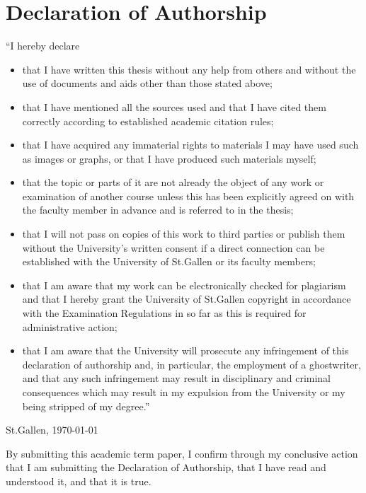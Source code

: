 \newpage
\thispagestyle{empty}

\section*{Declaration of Authorship}
“I hereby declare
\begin{itemize}
	\item that I have written this thesis without any help from others and without the use of documents and aids other than those stated above;

	\item that I have mentioned all the sources used and that I have cited them correctly according to established academic citation rules;

	\item that I have acquired any immaterial rights to materials I may have used such as images or graphs, or that I have produced such materials myself;

	\item that the topic or parts of it are not already the object of any work or examination of another course unless this has been explicitly agreed on with the faculty member in advance and is referred to in the thesis;

	\item that I will not pass on copies of this work to third parties or publish them without the University’s written consent if a direct connection can be established with the University of St.Gallen or its faculty members;

	\item that I am aware that my work can be electronically checked for plagiarism and that I hereby grant the University of St.Gallen copyright in accordance with the Examination Regulations in so far as this is required for administrative action;

	\item that I am aware that the University will prosecute any infringement of this declaration of authorship and, in particular, the employment of a ghostwriter, and that any such infringement may result in disciplinary and criminal consequences which may result in my expulsion from the University or my being stripped of my degree.”


\end{itemize}

\vspace{1cm}

\begin{minipage}{6.5cm}
\dotfill
\end{minipage} %
\newline
St.Gallen, \today


By submitting this academic term paper, I confirm through my conclusive action that I am submitting the Declaration of Authorship, that I have read and understood it, and that it is true.
